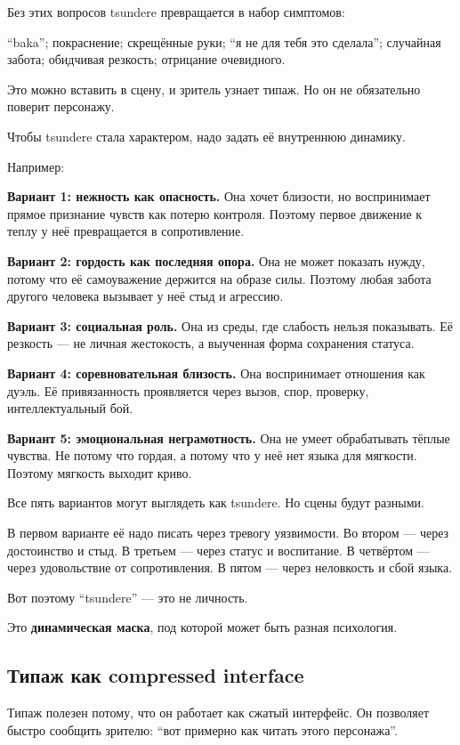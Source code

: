 Без этих вопросов tsundere превращается в набор симптомов:

``baka''; покраснение; скрещённые руки; ``я не для тебя это сделала'';
случайная забота; обидчивая резкость; отрицание очевидного.

Это можно вставить в сцену, и зритель узнает типаж. Но он не обязательно
поверит персонажу.

Чтобы tsundere стала характером, надо задать её внутреннюю динамику.

Например:

\textbf{Вариант 1: нежность как опасность.} Она хочет близости, но
воспринимает прямое признание чувств как потерю контроля. Поэтому первое
движение к теплу у неё превращается в сопротивление.

\textbf{Вариант 2: гордость как последняя опора.} Она не может показать
нужду, потому что её самоуважение держится на образе силы. Поэтому любая
забота другого человека вызывает у неё стыд и агрессию.

\textbf{Вариант 3: социальная роль.} Она из среды, где слабость нельзя
показывать. Её резкость --- не личная жестокость, а выученная форма
сохранения статуса.

\textbf{Вариант 4: соревновательная близость.} Она воспринимает
отношения как дуэль. Её привязанность проявляется через вызов, спор,
проверку, интеллектуальный бой.

\textbf{Вариант 5: эмоциональная неграмотность.} Она не умеет
обрабатывать тёплые чувства. Не потому что гордая, а потому что у неё
нет языка для мягкости. Поэтому мягкость выходит криво.

Все пять вариантов могут выглядеть как tsundere. Но сцены будут разными.

В первом варианте её надо писать через тревогу уязвимости. Во втором ---
через достоинство и стыд. В третьем --- через статус и воспитание. В
четвёртом --- через удовольствие от сопротивления. В пятом --- через
неловкость и сбой языка.

Вот поэтому ``tsundere'' --- это не личность.

Это \textbf{динамическая маска}, под которой может быть разная
психология.

\subsection*{Типаж как compressed interface}

Типаж полезен потому, что он работает как сжатый интерфейс. Он позволяет
быстро сообщить зрителю: ``вот примерно как читать этого персонажа''.

